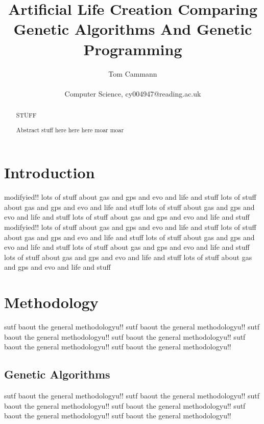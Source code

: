 \documentclass[10pt,twocolumn]{article}
\begin{document}
\title{Artificial Life Creation Comparing Genetic Algorithms And Genetic Programming}
\author{Tom Cammann\\\\
Computer Science, cy004947@reading.ac.uk}
\date{}
\maketitle
\begin{abstract}{STUFF}

	Abstract stuff here here here
	moar
	moar
\end{abstract}


\section{Introduction}
modifyied!!
lots of stuff about gas and gps and evo and life and stuff
lots of stuff about gas and gps and evo and life and stuff
lots of stuff about gas and gps and evo and life and stuff
lots of stuff about gas and gps and evo and life and stuff
modifyied!!
lots of stuff about gas and gps and evo and life and stuff
lots of stuff about gas and gps and evo and life and stuff
lots of stuff about gas and gps and evo and life and stuff
lots of stuff about gas and gps and evo and life and stuff
lots of stuff about gas and gps and evo and life and stuff
lots of stuff about gas and gps and evo and life and stuff


\section{Methodology}

sutf baout the general methodologyu!!
sutf baout the general methodologyu!!
sutf baout the general methodologyu!!
sutf baout the general methodologyu!!
sutf baout the general methodologyu!!
sutf baout the general methodologyu!!

\subsection{Genetic Algorithms}


sutf baout the general methodologyu!!
sutf baout the general methodologyu!!
sutf baout the general methodologyu!!
sutf baout the general methodologyu!!
sutf baout the general methodologyu!!
sutf baout the general methodologyu!!
\end{document}
